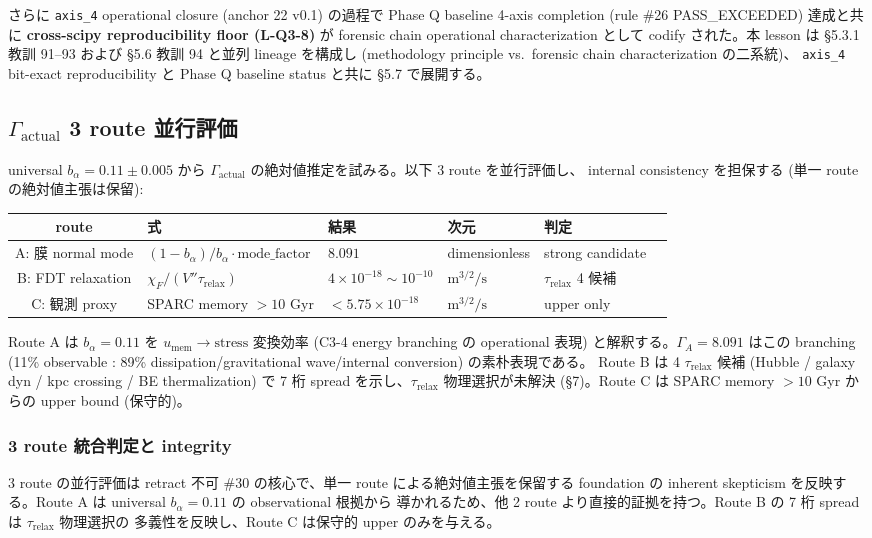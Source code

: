 \documentclass[11pt,a4paper]{ltjsarticle}
\newcommand{\taur}{\tau_{\mathrm{relax}}}
\newcommand{\bal}{b_{\alpha}}
\newcommand{\umem}{u_{\mathrm{mem}}}
\newcommand{\GammaA}{\Gamma_{A}}
\newcommand{\Gammaact}{\Gamma_{\mathrm{actual}}}
\begin{document}
\smallskip
\noindent
さらに \texttt{axis\_4} operational closure (anchor 22 v0.1) の過程で
Phase Q baseline 4-axis completion (rule \#26 PASS\_EXCEEDED) 達成と共に
\textbf{cross-scipy reproducibility floor (L-Q3-8)} が forensic chain
operational characterization として codify された。本 lesson は
\S 5.3.1 教訓 91--93 および \S 5.6 教訓 94 と並列 lineage を構成し
(methodology principle vs.\ forensic chain characterization の二系統)、
\texttt{axis\_4} bit-exact reproducibility と Phase Q baseline status と共に
\S 5.7 で展開する。


\subsection{$\Gammaact$ 3 route 並行評価}
universal $\bal = 0.11 \pm 0.005$ から $\Gammaact$ の絶対値推定を試みる。以下 3 route を並行評価し、
internal consistency を担保する (単一 route の絶対値主張は保留):

\begin{center}\small
\begin{tabular}{@{}clllll@{}}
\toprule
route & 式 & 結果 & 次元 & 判定 \\
\midrule
A: 膜 normal mode & $(1-\bal)/\bal \cdot \mathrm{mode\_factor}$ & $8.091$ & dimensionless & strong candidate \\
B: FDT relaxation & $\chi_F / (V'' \taur)$ & $4 \times 10^{-18}\sim 10^{-10}$ & $\mathrm{m}^{3/2}/\mathrm{s}$ & $\taur$ 4 候補 \\
C: 観測 proxy & SPARC memory $> 10$ Gyr & $< 5.75 \times 10^{-18}$ & $\mathrm{m}^{3/2}/\mathrm{s}$ & upper only \\
\bottomrule
\end{tabular}
\end{center}

Route A は $\bal = 0.11$ を $\umem \to \text{stress}$ 変換効率 (C3-4 energy branching の
operational 表現) と解釈する。$\GammaA = 8.091$ はこの branching
(11\% observable : 89\% dissipation/gravitational wave/internal conversion) の素朴表現である。
Route B は 4 $\taur$ 候補 (Hubble / galaxy dyn / kpc crossing / BE thermalization) で
7 桁 spread を示し、$\taur$ 物理選択が未解決 (\S 7)。Route C は SPARC memory $> 10$ Gyr からの
upper bound (保守的)。

\subsubsection{3 route 統合判定と integrity}
3 route の並行評価は retract 不可 \#30 の核心で、単一 route による絶対値主張を保留する foundation の
inherent skepticism を反映する。Route A は universal $\bal = 0.11$ の observational 根拠から
導かれるため、他 2 route より直接的証拠を持つ。Route B の 7 桁 spread は $\taur$ 物理選択の
多義性を反映し、Route C は保守的 upper のみを与える。
\end{document}
